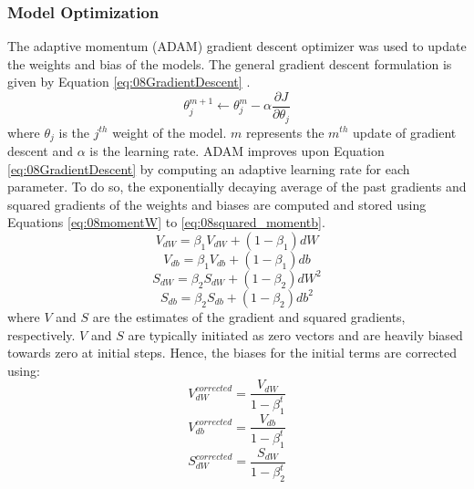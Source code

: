 \subsubsection{Model Optimization}

The adaptive momentum (ADAM) gradient descent optimizer was used to update the weights and bias of the models.  The general gradient descent formulation is given by Equation \ref{eq:08GradientDescent} \cite{ADAM}.  
\begin{equation}
    \theta_j^{m+1} \leftarrow \theta_j^{m} - \alpha \frac{\partial J}{\partial \theta_j}
    \label{eq:08GradientDescent}
\end{equation}
where $\theta_j$ is the $j^{th}$ weight of the model.  $m$ represents the $m^{th}$ update of gradient descent and $\alpha$ is the learning rate.  ADAM improves upon Equation \ref{eq:08GradientDescent} by computing an adaptive learning rate for each parameter. To do so, the exponentially decaying average of the past gradients and squared gradients of the weights and biases are computed and stored using Equations \ref{eq:08momentW} to \ref{eq:08squared_momentb}.
\begin{equation}
    V_{dW} = \beta_1 V_{dW} + (1 - \beta_1)dW
    \label{eq:08momentW}
\end{equation}
\begin{equation}
    V_{db} = \beta_1 V_{db} + (1 - \beta_1)db
    \label{eq:08momentb}
\end{equation}
\begin{equation}
    S_{dW} = \beta_2 S_{dW} + (1 - \beta_2)dW^2
    \label{eq:08squared_momentW}
\end{equation}
\begin{equation}
    S_{db} = \beta_2 S_{db} + (1 - \beta_2)db^2
    \label{eq:08squared_momentb}
\end{equation}
where $V$ and $S$ are the estimates of the gradient and squared gradients, respectively.  $V$ and $S$ are typically initiated as zero vectors and are heavily biased towards zero at initial steps.  Hence, the biases for the initial terms are corrected using:
\begin{equation}
    V_{dW}^{corrected} = \frac{V_{dW}}{1 - \beta_1^t}
\end{equation}
\begin{equation}
    V_{db}^{corrected} = \frac{V_{db}}{1 - \beta_1^t}
\end{equation}
\begin{equation}
    S_{dW}^{corrected} = \frac{S_{dW}}{1 - \beta_2^t}
\end{equation}
